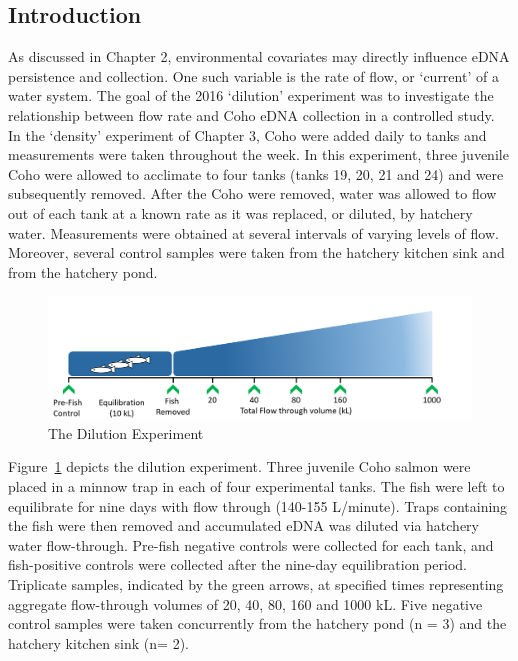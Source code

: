 \label{chapter:Exp}


\subsection{Introduction}

As discussed in Chapter 2, environmental covariates may directly influence eDNA persistence and collection. One such variable is the rate of flow, or `current' of a water system.
The goal of the 2016 `dilution' experiment was to investigate the relationship between flow rate and Coho eDNA collection in a controlled study.  In the `density' experiment of Chapter 3, Coho were added daily to tanks and measurements were taken throughout the week. In this experiment, three juvenile Coho were allowed to acclimate to four tanks (tanks 19, 20, 21 and 24) and were subsequently removed.  After the Coho were removed, water was allowed to flow out of each tank at a known rate as it was replaced, or diluted, by hatchery water. Measurements were obtained at several intervals of varying levels of flow. Moreover, several control samples were taken from the hatchery kitchen sink and from the hatchery pond.

\begin{figure}[H]
\includegraphics[scale=0.55,left]{Chapter4Images/dilutiontest.png}
\caption{ The Dilution Experiment \citep{fishforensics,hatchery}}
\label{fig:flowsamplinschedule1}
\end{figure}
		


Figure~\ref{fig:flowsamplinschedule1} depicts the dilution experiment. Three juvenile Coho salmon were placed in a minnow trap in each of four experimental tanks. The fish were left to equilibrate for nine days with flow through (140-155 L/minute). Traps containing the fish were then removed and accumulated eDNA was diluted via hatchery water flow-through. Pre-fish negative controls were collected for each tank, and fish-positive controls were collected after the nine-day equilibration period. Triplicate samples, indicated by the green arrows, at specified times representing aggregate flow-through volumes of 20, 40, 80, 160 and 1000 kL. Five negative control samples were taken concurrently from the hatchery pond (n = 3) and the hatchery kitchen sink (n= 2).

